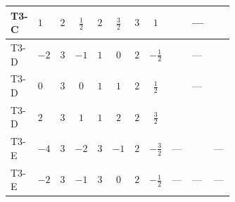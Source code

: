 \documentclass[8pt]{article}
\begin{document}
\begin{landscape}
\begin{longtable}{@{}llcccccc >{\raggedright\arraybackslash}p{0.21\linewidth} >{\raggedright\arraybackslash}p{0.21\linewidth} >{\raggedright\arraybackslash}p{0.21\linewidth}@{}}
\midrule
T3-C & $1$ & $2$ & $\frac{1}{2}$ & $2$ & $\frac{3}{2}$ & $3$ & $1$ & \scriptsize\adjustbox{max width=\linewidth}{$\begin{gathered} -9 {g_2}^2 {\lambda_{12}^{(1)}}\end{gathered}$} & --- & \scriptsize\adjustbox{max width=\linewidth}{$\begin{gathered} -15 {g_1}^2 {\lambda_{12}^{(1)}}\end{gathered}$} \\
\midrule
T3-D & $-2$ & $3$ & $-1$ & $1$ & $0$ & $2$ & $-\frac{1}{2}$ & \scriptsize\adjustbox{max width=\linewidth}{$\begin{gathered} -12 {g_2}^2 {\lambda_{12}^{(1)}}\end{gathered}$} & --- & \scriptsize\adjustbox{max width=\linewidth}{$\begin{gathered} -6 {g_1}^2 {\lambda_{12}^{(1)}}\end{gathered}$} \\
\midrule
T3-D & $0$ & $3$ & $0$ & $1$ & $1$ & $2$ & $\frac{1}{2}$ & \scriptsize\adjustbox{max width=\linewidth}{$\begin{gathered} -12 {g_2}^2 {\lambda_{12}^{(1)}}\end{gathered}$} & --- & \scriptsize\adjustbox{max width=\linewidth}{$\begin{gathered} -6 {g_1}^2 {\lambda_{12}^{(1)}}\end{gathered}$} \\
\midrule
T3-D & $2$ & $3$ & $1$ & $1$ & $2$ & $2$ & $\frac{3}{2}$ & \scriptsize\adjustbox{max width=\linewidth}{$\begin{gathered} -12 {g_2}^2 {\lambda_{12}^{(1)}}\end{gathered}$} & \scriptsize\adjustbox{max width=\linewidth}{$\begin{gathered} +48 {g_1}^4\end{gathered}$} & \scriptsize\adjustbox{max width=\linewidth}{$\begin{gathered} -30 {g_1}^2 {\lambda_{12}^{(1)}}\end{gathered}$} \\
\midrule
T3-E & $-4$ & $3$ & $-2$ & $3$ & $-1$ & $2$ & $-\frac{3}{2}$ & --- & \scriptsize\adjustbox{max width=\linewidth}{$\begin{gathered} +48 {g_1}^4\end{gathered}$} & --- \\
\midrule
T3-E & $-2$ & $3$ & $-1$ & $3$ & $0$ & $2$ & $-\frac{1}{2}$ & --- & --- & --- \\

\end{longtable}
\end{landscape}
\end{document}
